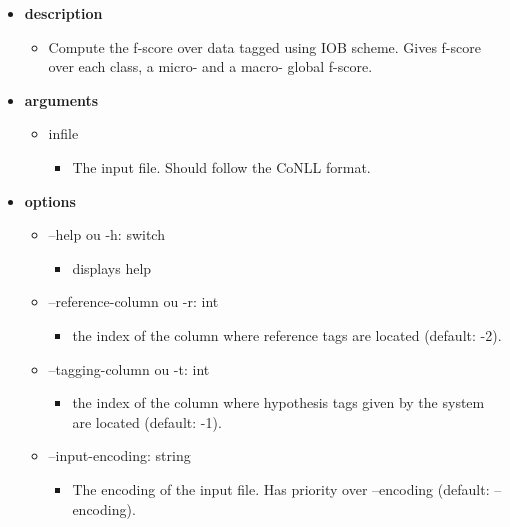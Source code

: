 \documentclass[manual-fr.tex]{subfiles}
\begin{document}
\begin{itemize}
    \item[] \textbf{description}
        \begin{itemize}
            \item[] Compute the f-score over data tagged using IOB scheme. Gives f-score over each class, a micro- and a macro- global f-score.
        \end{itemize}
    \item[] \textbf{arguments}
        \begin{itemize}
            \item[] infile
                \begin{itemize}
                    \item[] The input file. Should follow the CoNLL format.
                \end{itemize}
        \end{itemize}
    \item[] \textbf{options}
        \begin{itemize}
            \item[] --help ou -h: switch
                \begin{itemize}
                    \item[] displays help
                \end{itemize}
            \item[] --reference-column ou -r: int
                \begin{itemize}
                    \item[] the index of the column where reference tags are located (default: -2).
                \end{itemize}
            \item[] --tagging-column ou -t: int
                \begin{itemize}
                    \item[] the index of the column where hypothesis tags given by the system are located (default: -1).
                \end{itemize}
            \item[] --input-encoding: string
                \begin{itemize}
                    \item[] The encoding of the input file. Has priority over --encoding (default: --encoding).

\end{itemize}
\end{itemize}
\end{itemize}
\end{document}
